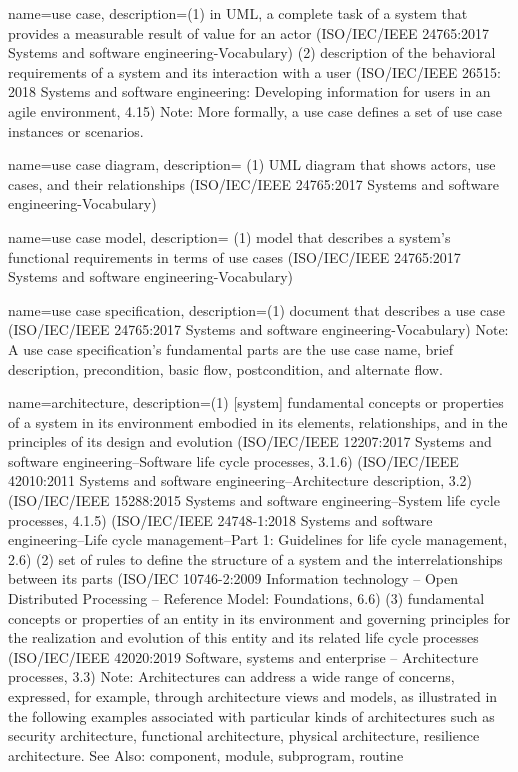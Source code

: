 {
    name={use case},
    description={(1) in UML, a complete task of a system that provides a measurable result of value for an actor (ISO/IEC/IEEE 24765:2017 Systems and software engineering-Vocabulary) (2) description of the behavioral requirements of a system and its interaction with a user (ISO/IEC/IEEE 26515: 2018 Systems and software engineering: Developing information for users in an agile environment, 4.15) Note: More formally, a use case defines a set of use case instances or scenarios.}
}

{
    name={use case diagram},
    description={ (1) UML diagram that shows actors, use cases, and their relationships (ISO/IEC/IEEE 24765:2017 Systems and software engineering-Vocabulary)}    
}

{
    name={use case model},
    description=
    {
        (1) model that describes a system's functional requirements in terms of use cases (ISO/IEC/IEEE 24765:2017 Systems and software engineering-Vocabulary)
    }
}

{
    name={use case specification},
    description={(1) document that describes a use case (ISO/IEC/IEEE 24765:2017 Systems and software engineering-Vocabulary) Note: A use case specification's fundamental parts are the use case name, brief description, precondition, basic flow, postcondition, and alternate flow.}
}

{
    name={architecture},
    description={(1) [system] fundamental concepts or properties of a system in its environment embodied in its elements, relationships, and in the principles of its design and evolution (ISO/IEC/IEEE 12207:2017 Systems and software engineering--Software life cycle processes, 3.1.6) (ISO/IEC/IEEE 42010:2011 Systems and software engineering--Architecture description, 3.2) (ISO/IEC/IEEE 15288:2015 Systems and software engineering--System life cycle processes, 4.1.5) (ISO/IEC/IEEE 24748-1:2018 Systems and software engineering--Life cycle management--Part 1: Guidelines for life cycle management, 2.6) (2) set of rules to define the structure of a system and the interrelationships between its parts (ISO/IEC 10746-2:2009 Information technology -- Open Distributed Processing -- Reference Model: Foundations, 6.6) (3) fundamental concepts or properties of an entity in its environment and governing principles for the realization and evolution of this entity and its related life cycle processes (ISO/IEC/IEEE 42020:2019 Software, systems and enterprise -- Architecture processes, 3.3) Note: Architectures can address a wide range of concerns, expressed, for example, through architecture views and models, as illustrated in the following examples associated with particular kinds of architectures such as security architecture, functional architecture, physical architecture, resilience architecture. See Also: component, module, subprogram, routine}
}


